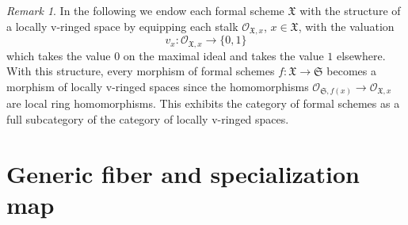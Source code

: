 \documentclass[12pt,twoside,a4paper]{article}
\theoremstyle{definition}
\theoremstyle{remark}
\newtheorem{rmk}[thm]{Remark}
\begin{document}
\begin{rmk}\label{Formal schemes as locally $v$-ringed spaces}In the following we endow each formal scheme $\mathfrak{X}$ with the structure of a locally v-ringed space by equipping each stalk $\mathcal{O}_{\mathfrak{X},x}$, $x\in\mathfrak{X}$, with the valuation \begin{equation*}v_{x}: \mathcal{O}_{\mathfrak{X},x}\to \{0,1\}\end{equation*}which takes the value $0$ on the maximal ideal and takes the value $1$ elsewhere. With this structure, every morphism of formal schemes $f: \mathfrak{X}\to\mathfrak{S}$ becomes a morphism of locally v-ringed spaces since the homomorphisms $\mathcal{O}_{\mathfrak{S},f(x)}\to\mathcal{O}_{\mathfrak{X},x}$ are local ring homomorphisms. This exhibits the category of formal schemes as a full subcategory of the category of locally v-ringed spaces.\end{rmk}

\section{Generic fiber and specialization map}\label{sec:generic fiber}
\end{document}
